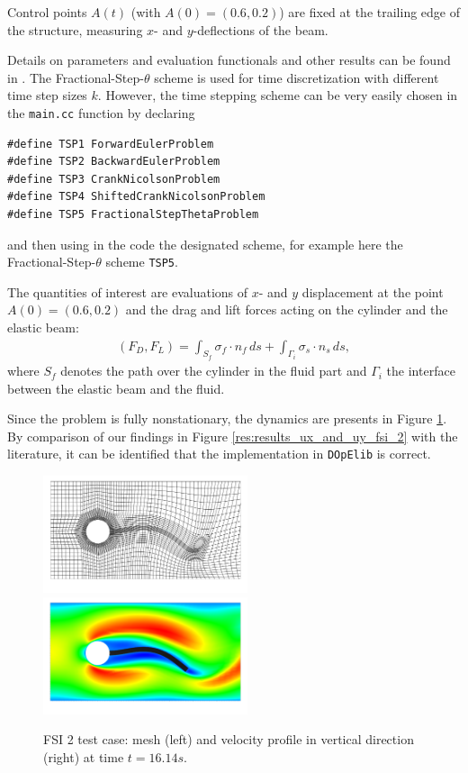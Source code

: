 \documentclass[prodmode,acmtoms]{acmsmall}
\numberwithin{equation}{section}
\newcommand{\dope}{\texttt{DOpElib}}
\begin{document}
Control points $A(t)$ (with $A(0) = (0.6,0.2)$) are fixed at the 
trailing edge of the structure, measuring $x$- and $y$-deflections of the beam.

Details 
on parameters and evaluation functionals and other results 
can be found in \cite{HrTu06b,BuSc06,DeHaeAnnBrVie10,Wi11}. 
The Fractional-Step-$\theta$ scheme is used for time discretization with
different time step sizes $k$. However, the time stepping scheme can be 
very easily chosen in the \texttt{main.cc} function by declaring
\begin{lstlisting}
#define TSP1 ForwardEulerProblem
#define TSP2 BackwardEulerProblem
#define TSP3 CrankNicolsonProblem
#define TSP4 ShiftedCrankNicolsonProblem
#define TSP5 FractionalStepThetaProblem
\end{lstlisting}
and then using in the code the designated scheme, 
for example here the Fractional-Step-$\theta$ scheme
\texttt{TSP5}.

The quantities of interest are evaluations of 
$x$- and $y$ displacement at the point $A(0) = (0.6,0.2)$
and the drag and lift forces acting on the cylinder and the elastic beam:
\begin{align}
\label{drag_lift_forces}
(F_D , F_L) 
= {\int_{S_f} \sigma_f \cdot n_f \, ds + 
\int_{\Gamma_i} \sigma_s \cdot n_s \, ds},
\end{align}
where $S_{f}$ denotes the path over the cylinder in the fluid part and
$\Gamma_i$ the interface between the elastic beam and the 
fluid.

Since the problem is fully nonstationary, the 
dynamics are presents in Figure \ref{res:fsi_2_mesh_and_x_velo}. 
By comparison of our findings in Figure \ref{res:results_ux_and_uy_fsi_2}
with the literature, it can be identified that 
the implementation in \dope{} is correct.



\begin{figure}[h]
\centering
{\includegraphics[width=6cm]{Pictures/visit_fsi_2_CNn_t_2e-2_global_3_biharmonic_mesh8070_scale.png}}
{\includegraphics[width=6cm]{Pictures/visit_fsi_2_CNn_t_2e-2_global_3_biharmonic_x_velo8070_scale.png}}
\caption{FSI 2 test case: mesh (left) and velocity profile in vertical 
direction (right) at time $t=16.14s$.}
\label{res:fsi_2_mesh_and_x_velo}
\end{figure}
\end{document}
